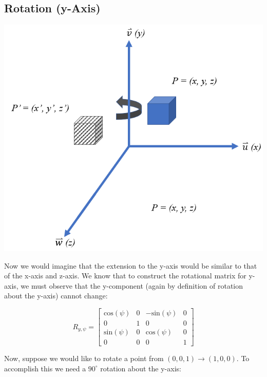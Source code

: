 \documentclass[12pt,letterpaper]{article}
\begin{document}
\subsection{Rotation (y-Axis)}
\includegraphics[scale=0.75]{yRotation}

Now we would imagine that the extension to the y-axis would be similar to that of the x-axis and z-axis. We know that to construct the rotational matrix for y-axis, we must observe that the y-component (again by definition of rotation about the y-axis) cannot change:

\begin{equation}
    R_{y, \psi} = \begin{bmatrix}
        \text{cos}(\psi)    & 0     & -\text{sin}(\psi) & 0 \\
        0                   & 1     &  0                & 0 \\
       \text{sin}(\psi)     & 0     &  \text{cos}(\psi) & 0 \\
        0                   & 0     &  0                & 1
    \end{bmatrix}
\end{equation}

\newpage

Now, suppose we would like to rotate a point from $(0, 0, 1) \rightarrow (1, 0, 0)$. To accomplish this we need a $90^{\circ}$ rotation about the y-axis:
\end{document}

